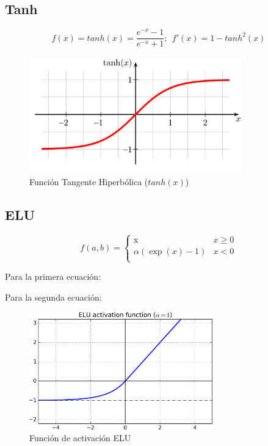 \subsection{Tanh}

\begin{equation}
    f(x)=tanh(x)=\frac{e^{-x}-1}{e^{-x}+1}; \ \ f'(x)=1-tanh^2(x)
\end{equation}
\vspace{1cm}
\hspace{1.5cm}

\newline

\begin{figure}[H]
    \centering
    \includegraphics[height=2in]{image/tanh}
    \caption{Función Tangente Hiperbólica ($tanh(x)$)}
    \label{fig:my_label}
\end{figure}

\subsection{ELU}

\[   
f(a,b) = 
     \begin{cases}
        \text{x} & x \geq 0 \\
       \text{$\alpha (\exp(x)-1)$} & x < 0 \\
     \end{cases}
\]

Para la primera ecuación:
\vspace{1cm}
\hspace{5.5cm}

\newline
Para la segunda ecuación:
\vspace{1cm}
\hspace{1.5cm}

\newline
\newline

\begin{figure}[H]
    \centering
    \includegraphics[height=2in]{image/ELU}
    \caption{Función de activación ELU}
    \label{fig:my_label}
\end{figure}



